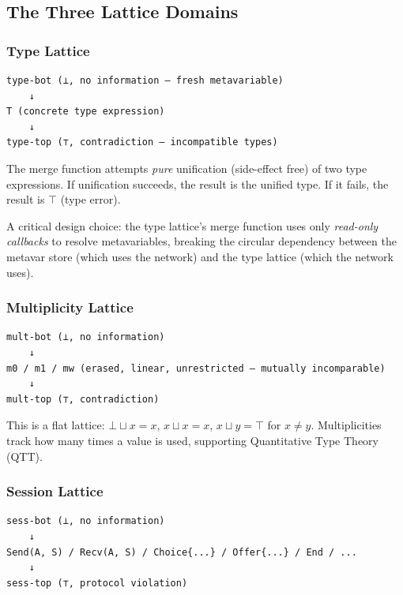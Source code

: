 \documentclass[11pt]{article}
\begin{document}
\subsection{The Three Lattice Domains}
\label{sec:org5375384}

\subsubsection{Type Lattice}
\label{sec:orgbcdf05f}

\begin{verbatim}
type-bot (⊥, no information — fresh metavariable)
    ↓
T (concrete type expression)
    ↓
type-top (⊤, contradiction — incompatible types)
\end{verbatim}

The merge function attempts \emph{pure} unification (side-effect free) of
two type expressions. If unification succeeds, the result is the unified
type. If it fails, the result is \(\top\) (type error).

A critical design choice: the type lattice's merge function uses only
\emph{read-only callbacks} to resolve metavariables, breaking the circular
dependency between the metavar store (which uses the network) and the
type lattice (which the network uses).
\subsubsection{Multiplicity Lattice}
\label{sec:org2136a55}

\begin{verbatim}
mult-bot (⊥, no information)
    ↓
m0 / m1 / mw (erased, linear, unrestricted — mutually incomparable)
    ↓
mult-top (⊤, contradiction)
\end{verbatim}

This is a flat lattice: \(\bot \sqcup x = x\), \(x \sqcup x = x\), \(x
\sqcup y = \top\) for \(x \neq y\). Multiplicities track how many times a
value is used, supporting Quantitative Type Theory (QTT).
\subsubsection{Session Lattice}
\label{sec:org3afce1c}

\begin{verbatim}
sess-bot (⊥, no information)
    ↓
Send(A, S) / Recv(A, S) / Choice{...} / Offer{...} / End / ...
    ↓
sess-top (⊤, protocol violation)
\end{verbatim}
\end{document}
